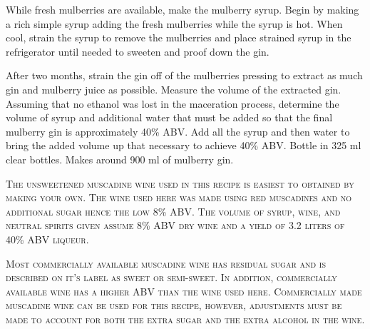\documentclass[letterpaper]{recipePMG}
\begin{document}
 While fresh mulberries are available, make the mulberry syrup. Begin by making a rich simple syrup adding the fresh mulberries while the syrup is hot. When cool, strain the syrup to remove the mulberries and place strained syrup in the refrigerator until needed to sweeten and proof down the gin.
 
 After two months, strain the gin off of the mulberries pressing to extract as much gin and mulberry juice as possible.  Measure the volume of the extracted gin.  Assuming that no ethanol was lost in the maceration process, determine the volume of syrup and additional water that must be added so that the final mulberry gin is approximately 40\% ABV. Add all the syrup and then water to bring the added volume up that necessary to achieve 40\% ABV. Bottle in 325 ml clear bottles. Makes around 900 ml of mulberry gin.
 
\newpage 





\textsc{The unsweetened muscadine wine used in this recipe is easiest to obtained by making your own. The wine used here was made using red muscadines and no additional sugar hence the low 8\% ABV. The volume of syrup, wine, and neutral spirits given assume  8\% ABV  dry wine and a yield of 3.2 liters of 40\% ABV liqueur.}

\textsc{Most commercially available muscadine wine has residual sugar and is described on it's label as sweet or semi-sweet.  In addition, commercially available wine has a higher ABV than the wine used here. Commercially made muscadine wine can be used for this recipe, however, adjustments must be made to account for both the extra sugar and the extra alcohol in the wine.}
\end{document}
